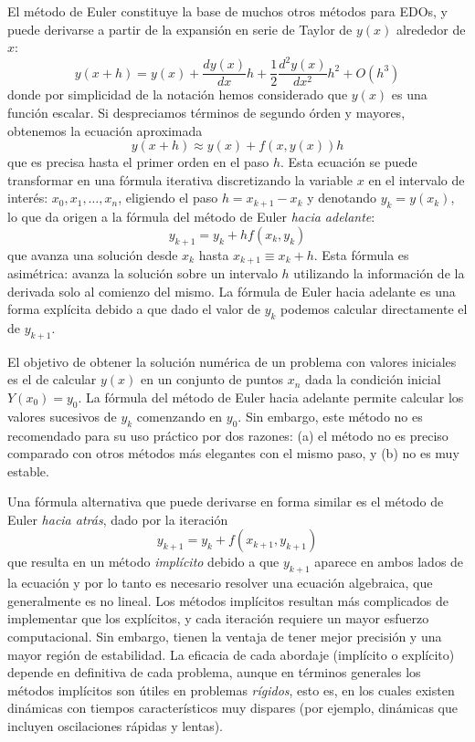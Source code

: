 El método de Euler constituye la base de muchos otros métodos para EDOs, y puede derivarse a partir de la expansión en serie de Taylor de $y(x)$ alrededor de $x$:
\begin{equation}\label{eq:taylor}
 y(x+h) = y(x) + \frac{dy(x)}{dx} h  + \frac{1}{2} \frac{d^2y(x)}{dx^2} h^2 + O(h^3)
\end{equation} 
donde por simplicidad de la notación hemos considerado que $y(x)$ es una función escalar. Si despreciamos términos de segundo órden y mayores, obtenemos la ecuación aproximada
\begin{equation}
 y(x+h) \approx y(x) + f(x, y(x)) h
\end{equation} 
que es precisa hasta el primer orden en el paso $h$. Esta ecuación se puede transformar en una fórmula iterativa discretizando la variable $x$ en el intervalo de interés: $x_0, x_1, \ldots, x_n$, eligiendo el paso $h = x_{k+1} -x_{k}$ y denotando $y_k = y(x_k)$, lo que da origen a la fórmula del método de Euler \textit{hacia adelante}:
 \begin{equation} \label{eq:euler}
  y_{k+1} = y_k + hf(x_k, y_k)
 \end{equation} 
que avanza una solución desde $x_k$ hasta $x_{k+1} \equiv x_k + h$. Esta fórmula es asimétrica: avanza la solución sobre un intervalo $h$ utilizando la información de la derivada solo al comienzo del mismo. La fórmula de Euler hacia adelante es una forma explícita debido a que dado el valor de $y_k$ podemos calcular directamente el de $y_{k+1}$. 
 
El objetivo de obtener la solución numérica de un problema con valores iniciales es el de calcular $y(x)$ en un conjunto de puntos $x_n$ dada la condición inicial $Y(x_0) = y_0$. La fórmula del método de Euler hacia adelante permite calcular los valores sucesivos de $y_k$ comenzando en $y_0$. Sin embargo, este método no es recomendado para su uso práctico por dos razones: (a) el método no es preciso comparado con otros métodos más elegantes con el mismo paso, y (b) no es muy estable.
 
 Una fórmula alternativa que puede derivarse en forma similar es el método de Euler \textit{hacia atrás}, dado por la iteración
 \begin{equation}
  y_{k+1} = y_k + f(x_{k+1}, y_{k+1})
 \end{equation} 
que resulta en un método \textit{implícito} debido a que $y_{k+1}$ aparece en ambos lados de la ecuación y por lo tanto es necesario resolver una ecuación algebraica, que generalmente es no lineal. Los métodos implícitos resultan más complicados de implementar que los explícitos, y cada iteración requiere un mayor esfuerzo computacional. Sin embargo, tienen la ventaja de tener mejor precisión y una mayor región de estabilidad. La eficacia de cada abordaje (implícito o explícito) depende en definitiva de cada problema, aunque en términos generales los métodos implícitos son útiles en problemas \textit{rígidos}, esto es, en los cuales existen dinámicas con tiempos característicos muy dispares (por ejemplo, dinámicas que incluyen oscilaciones rápidas y lentas).
 
